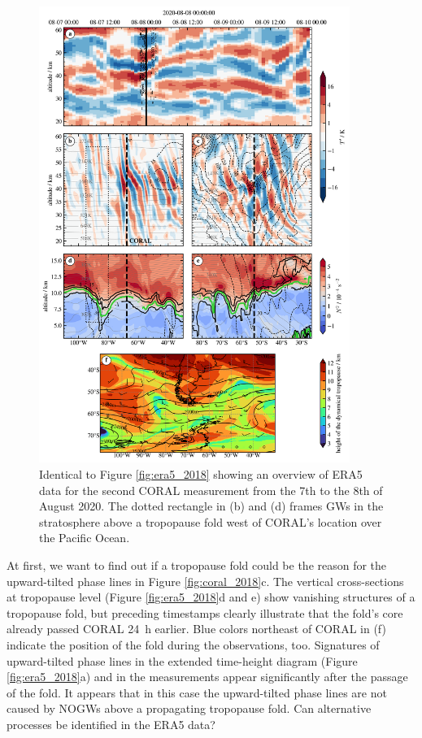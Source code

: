 %
\begin{figure}[tbp]
    \centering
    \includegraphics[width=0.9\textwidth]{figures_lidar/era5_trop_strat_24.png}
    \caption{Identical to Figure \ref{fig:era5_2018} showing an overview of ERA5 data for the second CORAL measurement from the 7th to the 8th of August 2020. The dotted rectangle in (b) and (d) frames GWs in the stratosphere above a tropopause fold west of CORAL's location over the Pacific Ocean.}
    \label{fig:era5_2020}
\end{figure}
%
At first, we want to find out if a tropopause fold could be the reason for the upward-tilted phase lines in Figure \ref{fig:coral_2018}c. The vertical cross-sections at tropopause level (Figure \ref{fig:era5_2018}d and e) show vanishing structures of a tropopause fold, but preceding timestamps clearly illustrate that the fold's core already passed CORAL \SI{24}{h} earlier. Blue colors northeast of CORAL in (f) indicate the position of the fold during the observations, too. Signatures of upward-tilted phase lines in the extended time-height diagram (Figure \ref{fig:era5_2018}a) and in the measurements appear significantly after the passage of the fold. It appears that in this case the upward-tilted phase lines are not caused by NOGWs above a propagating tropopause fold. Can alternative processes be identified in the ERA5 data?

